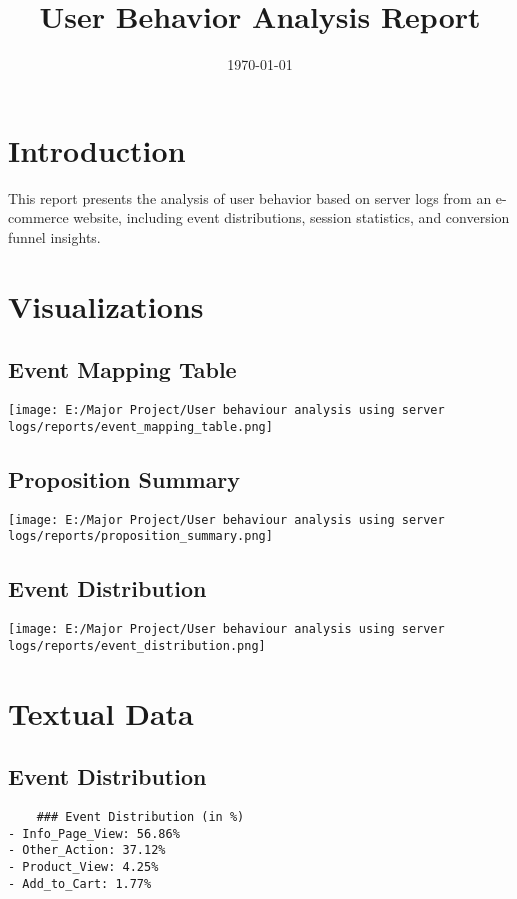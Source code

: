 \documentclass{article}
\begin{document}
    \title{User Behavior Analysis Report}
    \author{}
    \date{\today}
    \maketitle
    
    \section{Introduction}
    This report presents the analysis of user behavior based on server logs from an e-commerce website, including event distributions, session statistics, and conversion funnel insights.
    
    \section{Visualizations}
    
    \subsection{Event Mapping Table}
    \texttt{[image: E:/Major Project/User behaviour analysis using server logs/reports/event\_mapping\_table.png]}
    
    \subsection{Proposition Summary}
    \texttt{[image: E:/Major Project/User behaviour analysis using server logs/reports/proposition\_summary.png]}
    
    \subsection{Event Distribution}
    \texttt{[image: E:/Major Project/User behaviour analysis using server logs/reports/event\_distribution.png]}
    
    \section{Textual Data}
    
    \subsection{Event Distribution}
    \begin{verbatim}
    ### Event Distribution (in %)
- Info_Page_View: 56.86%
- Other_Action: 37.12%
- Product_View: 4.25%
- Add_to_Cart: 1.77%

    \end{verbatim}
    
\end{document}
